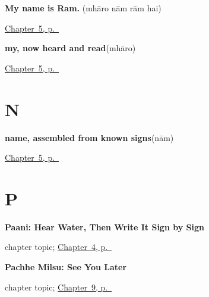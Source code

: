 \noindent\begin{minipage}[t]{\linewidth}
\raggedright
\textbf{My name is Ram.}\enspace\emph{   }\enspace(mhāro nām rām hai)\par
\footnotesize \hyperref[ch:mw-name-answer]{Chapter~5, p.~\pageref*{ch:mw-name-answer}}
\end{minipage}\par\smallskip

\noindent\begin{minipage}[t]{\linewidth}
\raggedright
\textbf{my, now heard and read}\enspace\emph{}\enspace(mhāro)\par
\footnotesize \hyperref[ch:mw-name-answer]{Chapter~5, p.~\pageref*{ch:mw-name-answer}}
\end{minipage}\par\smallskip

\section*{N}

\noindent\begin{minipage}[t]{\linewidth}
\raggedright
\textbf{name, assembled from known signs}\enspace\emph{}\enspace(nām)\par
\footnotesize \hyperref[ch:mw-name-answer]{Chapter~5, p.~\pageref*{ch:mw-name-answer}}
\end{minipage}\par\smallskip

\section*{P}

\noindent\begin{minipage}[t]{\linewidth}
\raggedright
\textbf{Paani: Hear Water, Then Write It Sign by Sign}\par
\footnotesize chapter topic; \hyperref[ch:mw-paani]{Chapter~4, p.~\pageref*{ch:mw-paani}}
\end{minipage}\par\smallskip

\noindent\begin{minipage}[t]{\linewidth}
\raggedright
\textbf{Pachhe Milsu: See You Later}\par
\footnotesize chapter topic; \hyperref[ch:mw-see-you-later]{Chapter~9, p.~\pageref*{ch:mw-see-you-later}}
\end{minipage}\par\smallskip

